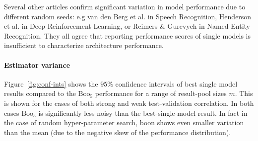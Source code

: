 \documentclass{article}
\newcommand{\boo}[1]{\text{Boo}_{#1}}
\newcommand{\tboon}{\gls{boon}\xspace}
\begin{document}
Several other articles confirm significant variation in model performance due to different random seeds: e.g van den Berg et al.  in Speech Recognition, Henderson et al.  in Deep Reinforcement Learning, or Reimers \& Gurevych  in Named Entity Recognition. They all agree that reporting performance scores of single models is insufficient to characterize architecture performance. 

\paragraph{Estimator variance} Figure~\ref{fig:conf-ints} shows the $95\%$ confidence intervals of best single model results compared to the $\boo{5}$ performance for a range of result-pool sizes $m$. This is shown for the cases of both strong and weak test-validation correlation. In both cases $\boo{5}$ is significantly less noisy than the best-single-model result. In fact in the case of random hyper-parameter search, \tboon shows even smaller variation than the mean (due to the negative skew of the performance distribution).
\end{document}
